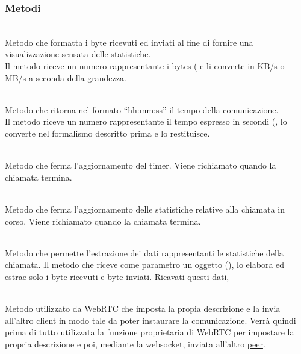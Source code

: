 \subsubsection*{Metodi}
\begin{description}
\item{}\\
Metodo che formatta i byte ricevuti ed inviati al fine di fornire una visualizzazione sensata delle statistiche.\\
Il metodo riceve un numero rappresentante i bytes ( e li converte in KB/s o MB/s a seconda della grandezza.

\item{}\\
Metodo che ritorna nel formato ``hh:mm:ss'' il tempo della comunicazione.\\
Il metodo riceve un numero rappresentante il tempo espresso in secondi (, lo converte nel formalismo descritto prima e lo restituisce.

\item{}\\
Metodo che ferma l'aggiornamento del timer. Viene richiamato quando la chiamata termina.

\item{}\\
Metodo che ferma l'aggiornamento delle statistiche relative alla chiamata in corso. Viene richiamato quando la chiamata termina.

\item{}\\
 Metodo che permette l'estrazione dei dati rappresentanti le statistiche della chiamata. Il metodo che riceve come parametro un oggetto (), lo elabora ed estrae solo i byte ricevuti e byte inviati. Ricavati questi dati, 
 
\item{}\\
Metodo utilizzato da WebRTC che imposta la propia descrizione e la invia all'altro client in modo tale da poter instaurare la comunicazione. Verrà quindi prima di tutto utilizzata la funzione proprietaria di WebRTC  per impostare la propria descrizione e poi, mediante la websocket, inviata all'altro \underline{peer}.
 

\end{description}
